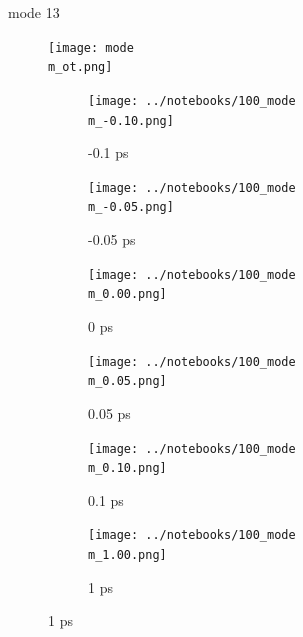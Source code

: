 \documentclass{beamer}
\begin{document}
\renewcommand\m{13}
\begin{frame}{mode \m}
		\vspace{\vh mm}
	\begin{figure}
		\centering
		\texttt{[image: mode\\m\_ot.png]}
	\end{figure}
	\begin{figure}
		\centering
		\begin{subfigure}[b]{\w\textwidth}
			\centering
			\texttt{[image: ../notebooks/100\_mode\\m\_-0.10.png]}
			\caption{-0.1 ps}
		\end{subfigure}
		\begin{subfigure}[b]{\w\textwidth}
			\centering
			\texttt{[image: ../notebooks/100\_mode\\m\_-0.05.png]}
			\caption{-0.05 ps}
		\end{subfigure}
		\begin{subfigure}[b]{\w\textwidth}
			\centering
			\texttt{[image: ../notebooks/100\_mode\\m\_0.00.png]}
			\caption{0 ps}
		\end{subfigure}
		\begin{subfigure}[b]{\w\textwidth}
			\centering
			\texttt{[image: ../notebooks/100\_mode\\m\_0.05.png]}
			\caption{0.05 ps}
		\end{subfigure}
		\begin{subfigure}[b]{\w\textwidth}
			\centering
			\texttt{[image: ../notebooks/100\_mode\\m\_0.10.png]}
			\caption{0.1 ps}
		\end{subfigure}
		\begin{subfigure}[b]{\w\textwidth}
			\centering
			\texttt{[image: ../notebooks/100\_mode\\m\_1.00.png]}
			\caption{1 ps}
		\end{subfigure}
	\end{figure}
\end{frame}
\end{document}
